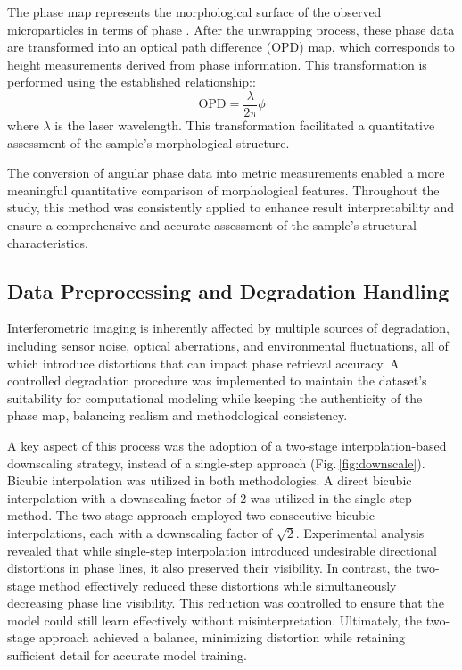 \documentclass[10pt,twocolumn]{article}
\begin{document}
The phase map represents the morphological surface of the observed microparticles in terms of phase \cite{Marquet2005}. After the unwrapping process, these phase data are transformed into an optical path difference (OPD) map, which corresponds to height measurements derived from phase information. This transformation is performed using the established relationship:\cite{Vannoni2007}:
\begin{equation}
\text{OPD} = \frac{\lambda}{2\pi} \phi
\end{equation}
where \( \lambda \) is the laser wavelength. This transformation facilitated a quantitative assessment of the sample's morphological structure.

The conversion of angular phase data into metric measurements enabled a more meaningful quantitative comparison of morphological features. Throughout the study, this method was consistently applied to enhance result interpretability and ensure a comprehensive and accurate assessment of the sample's structural characteristics.

\subsection{Data Preprocessing and Degradation Handling}

Interferometric imaging is inherently affected by multiple sources of degradation, including sensor noise, optical aberrations, and environmental fluctuations, all of which introduce distortions that can impact phase retrieval accuracy. A controlled degradation procedure was implemented to maintain the dataset's suitability for computational modeling while keeping the authenticity of the phase map, balancing realism and methodological consistency.

A key aspect of this process was the adoption of a two-stage interpolation-based downscaling strategy, instead of a single-step approach (Fig.\,\ref{fig:downscale}). Bicubic interpolation was utilized in both methodologies. A direct bicubic interpolation with a downscaling factor of 2 was utilized in the single-step method. The two-stage approach employed two consecutive bicubic interpolations, each with a downscaling factor of \(\sqrt{2}\). Experimental analysis revealed that while single-step interpolation introduced undesirable directional distortions in phase lines, it also preserved their visibility. In contrast, the two-stage method effectively reduced these distortions while simultaneously decreasing phase line visibility. This reduction was controlled to ensure that the model could still learn effectively without misinterpretation. Ultimately, the two-stage approach achieved a balance, minimizing distortion while retaining sufficient detail for accurate model training.
\end{document}
